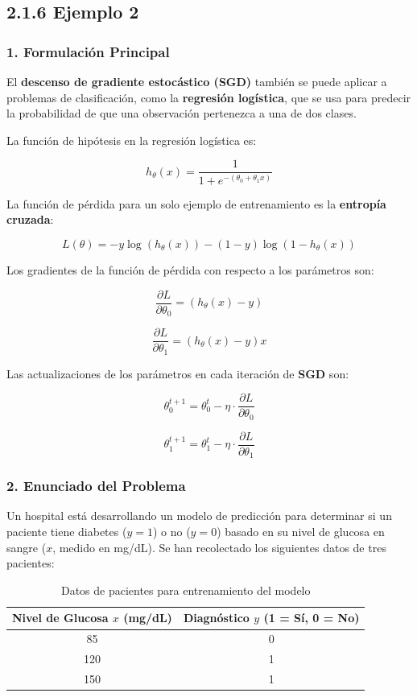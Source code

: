 \documentclass{article}
\begin{document}
\subsection*{2.1.6 Ejemplo 2}

\subsubsection*{1. Formulación Principal}

El \textbf{descenso de gradiente estocástico (SGD)} también se puede aplicar a problemas de clasificación, como la \textbf{regresión logística}, que se usa para predecir la probabilidad de que una observación pertenezca a una de dos clases.  

La función de hipótesis en la regresión logística es:

\[
h_\theta(x) = \frac{1}{1 + e^{-(\theta_0 + \theta_1 x)}}
\]

La función de pérdida para un solo ejemplo de entrenamiento es la \textbf{entropía cruzada}:

\[
L(\theta) = - y \log(h_\theta(x)) - (1 - y) \log(1 - h_\theta(x))
\]

Los gradientes de la función de pérdida con respecto a los parámetros son:

\[
\frac{\partial L}{\partial \theta_0} = (h_\theta(x) - y)
\]

\[
\frac{\partial L}{\partial \theta_1} = (h_\theta(x) - y) x
\]

Las actualizaciones de los parámetros en cada iteración de \textbf{SGD} son:

\[
\theta_0^{t+1} = \theta_0^t - \eta \cdot \frac{\partial L}{\partial \theta_0}
\]

\[
\theta_1^{t+1} = \theta_1^t - \eta \cdot \frac{\partial L}{\partial \theta_1}
\]

\subsubsection*{2. Enunciado del Problema}

Un hospital está desarrollando un modelo de predicción para determinar si un paciente tiene diabetes (\( y = 1 \)) o no (\( y = 0 \)) basado en su nivel de glucosa en sangre (\( x \), medido en mg/dL). Se han recolectado los siguientes datos de tres pacientes:

\begin{table}[h]
	\centering
	\begin{tabular}{|c|c|}
		\hline
		Nivel de Glucosa \( x \) (mg/dL) & Diagnóstico \( y \) (1 = Sí, 0 = No) \\
		\hline
		85 & 0 \\
		120 & 1 \\
		150 & 1 \\
		\hline
	\end{tabular}
	\caption{Datos de pacientes para entrenamiento del modelo}
\end{table}
\end{document}
